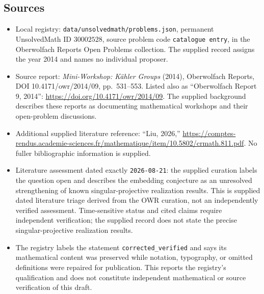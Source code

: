 \documentclass[11pt]{article}
\begin{document}
\subsection{Sources}
\begin{itemize}
\item Local registry: \texttt{data/unsolvedmath/problems.json}, permanent UnsolvedMath ID \(30002528\), source problem code \texttt{catalogue entry}, in the Oberwolfach Reports Open Problems collection. The supplied record assigns the year 2014 and names no individual proposer.
\item Source report: \emph{Mini-Workshop: Kähler Groups} (2014), Oberwolfach Reports, DOI 10.4171/owr/2014/09, pp.\ 531--553. Listed also as ``Oberwolfach Report 9, 2014'': \url{https://doi.org/10.4171/owr/2014/09}. The supplied background describes these reports as documenting mathematical workshops and their open-problem discussions.
\item Additional supplied literature reference: ``Liu, 2026,'' \url{https://comptes-rendus.academie-sciences.fr/mathematique/item/10.5802/crmath.811.pdf}. No fuller bibliographic information is supplied.
\item Literature assessment dated exactly \texttt{2026-08-21}: the supplied curation labels the question open and describes the embedding conjecture as an unresolved strengthening of known singular-projective realization results. This is supplied dated literature triage derived from the OWR curation, not an independently verified assessment. Time-sensitive status and cited claims require independent verification; the supplied record does not state the precise singular-projective realization results.
\item The registry labels the statement \texttt{corrected\_verified} and says its mathematical content was preserved while notation, typography, or omitted definitions were repaired for publication. This reports the registry's qualification and does not constitute independent mathematical or source verification of this draft.
\end{itemize}
\end{document}
